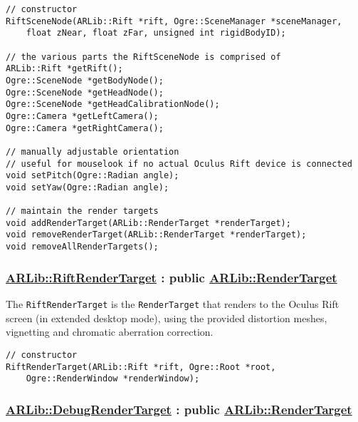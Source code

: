 \begin{lstlisting}
// constructor
RiftSceneNode(ARLib::Rift *rift, Ogre::SceneManager *sceneManager,
    float zNear, float zFar, unsigned int rigidBodyID);

// the various parts the RiftSceneNode is comprised of
ARLib::Rift *getRift();
Ogre::SceneNode *getBodyNode();
Ogre::SceneNode *getHeadNode();
Ogre::SceneNode *getHeadCalibrationNode();
Ogre::Camera *getLeftCamera();
Ogre::Camera *getRightCamera();

// manually adjustable orientation
// useful for mouselook if no actual Oculus Rift device is connected
void setPitch(Ogre::Radian angle);
void setYaw(Ogre::Radian angle);

// maintain the render targets
void addRenderTarget(ARLib::RenderTarget *renderTarget);
void removeRenderTarget(ARLib::RenderTarget *renderTarget);
void removeAllRenderTargets();
\end{lstlisting}

\subsubsection{\texorpdfstring{\href{https://github.com/ands/OculusMeetsAR/blob/master/ARLib/include/ARLib/Ogre/RiftRenderTarget.h}{ARLib::RiftRenderTarget}
: public
\href{https://github.com/ands/OculusMeetsAR/blob/master/ARLib/include/ARLib/Ogre/RenderTarget.h}{ARLib::RenderTarget}}{ARLib::RiftRenderTarget : public ARLib::RenderTarget}}\label{arlibriftrendertarget-public-arlibrendertarget}

The \texttt{RiftRenderTarget} is the \texttt{RenderTarget} that renders to the Oculus Rift
screen (in extended desktop mode), using the provided distortion meshes,
vignetting and chromatic aberration correction.

\begin{lstlisting}
// constructor
RiftRenderTarget(ARLib::Rift *rift, Ogre::Root *root,
    Ogre::RenderWindow *renderWindow);
\end{lstlisting}

\subsubsection{\texorpdfstring{\href{https://github.com/ands/OculusMeetsAR/blob/master/ARLib/include/ARLib/Ogre/DebugRenderTarget.h}{ARLib::DebugRenderTarget}
: public
\href{https://github.com/ands/OculusMeetsAR/blob/master/ARLib/include/ARLib/Ogre/RenderTarget.h}{ARLib::RenderTarget}}{ARLib::DebugRenderTarget : public ARLib::RenderTarget}}\label{arlibdebugrendertarget-public-arlibrendertarget}

